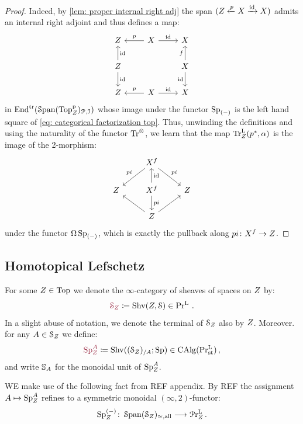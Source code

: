 \begin{proof}
    Indeed, by \cref{lem: proper internal right adj} the span 
    $(Z \xleftarrow{p} X \xrightarrow{\operatorname{id}} X)$ admits an internal
    right adjoint and thus defines a map:
    \[
    \begin{tikzcd}
	\base & X & X \\
	\base && X \\
	\base & X & X 
	\arrow["p"', from=1-2, to=1-1]
	\arrow["\id", from=1-2, to=1-3]
	\arrow["\id"', from=2-1, to=1-1]
	\arrow["\id", from=2-1, to=3-1]
	\arrow["f", from=2-3, to=1-3]
	\arrow["\id"', from=2-3, to=3-3]
	\arrow["p"', from=3-2, to=3-1]
	\arrow["\id", from=3-2, to=3-3]
\end{tikzcd}
\]
in $\mathrm{End}^{\mathrm{tr}}(\operatorname{\mathcal S\mathrm{pan}}({\mathrm{Top}^{\mathrm{p}}_{Z}})_{\mathcal{P},\mathcal{I}})$ whose image under the functor 
$\operatorname{Sp}_{(-)}$ is the left hand square of \eqref{eq: categorical factorization top}. Thus, unwinding the definitions and using the naturality of the
functor $\mathrm{Tr}^{\otimes}$, we learn that the map $\mathrm{Tr}^{\mathrm{L}}_{Z}(p^*,\alpha)$
is the image of the 2-morphism: 
\[
\begin{tikzcd}
	& {X^f} & \\
	\base & {X^f} & \base \\
	& \base
	\arrow["pi"', from=1-2, to=2-1]
	\arrow["pi", from=1-2, to=2-3]
	\arrow["\id"', from=2-2, to=1-2]
	\arrow["pi", from=2-2, to=3-2]
	\arrow[from=3-2, to=2-1]
	\arrow[from=3-2, to=2-3]
\end{tikzcd}
\]
under the functor $\Omega \operatorname{Sp}_{(-)}$, which is exactly the pullback along 
$pi\colon X^f \to Z$. 
\end{proof}

\subsection{Homotopical Lefschetz}
\begin{defn}
    For some $Z \in \mathrm{Top}$ we denote the $\infty$-category
    of sheaves of spaces on $Z$ by:
    \[\mdef{\pSpc{\base}}\coloneq \Shv(\base,\Spc) \in \Prl\,.\]
    In a slight abuse of notation, we denote the terminal 
    of $\mathcal{S}_{Z}$ also by $Z$. 
    Moreover. for any $A\in \mathcal{S}_{Z}$ we define:
    \[ \mdef{\pSp{\base}{A}}\coloneq \Shv((\pSpc{\base})_{/A};\Sp)\in \CAlg(\Prlst)\,, \]
    and write $\mathbb{S}_{A}$ for the monoidal unit of $\operatorname{Sp}_{Z}^{A}$.
\end{defn}

WE make use of the following fact from REF appendix. 
By REF the assignment $A\mapsto \operatorname{Sp}_{Z}^{A}$ refines to a symmetric
monoidal $(\infty,2)$-functor:
\[ \operatorname{Sp}_{Z}^{(-)}\colon \operatorname{\mathcal S\mathrm{pan}}({\mathcal{S}_{Z}})_{\simeq,\mathrm{all}} \longrightarrow \mathcal{P}\mathrm{r}^{\mathrm{L}}_{Z}\,.\]

